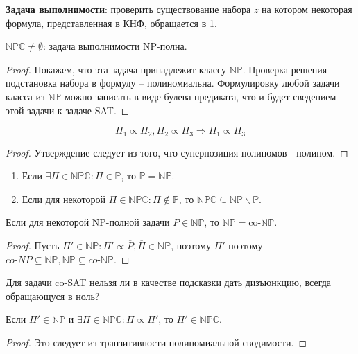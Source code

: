 \documentclass[11pt]{article}
\newcounter{th}\setcounter{th}{0}
\def\th{\par\smallskip\refstepcounter{th}\textbf{\arabic{th}}}
\newtheorem*{Theorem}{Теорема \th}
\newcounter{stnmt}\setcounter{stnmt}{0}
\def\st{\par\smallskip\refstepcounter{stnmt}\textbf{\arabic{stnmt}}}
\newtheorem*{Statement}{Утверждение \st}
\begin{document}
\textbf{Задача выполнимости}: проверить существование набора \(z\) на котором некоторая формула,
представленная в КНФ, обращается в 1.
\begin{Theorem}
$\mathbb{NPC} \neq \emptyset$: задача выполнимости NP-полна.
\end{Theorem}
\begin{proof}
Покажем, что эта задача принадлежит классу $\mathbb{NP}$. Проверка решения -- подстановка
набора в формулу -- полиномиальна. Формулировку любой задачи класса из $\mathbb{NP}$ можно
записать в виде булева предиката, что и будет сведением этой задачи к задаче SAT.
\end{proof}
\begin{Statement}
\begin{equation*}
\Pi_1 \propto \Pi_2, \Pi_2 \propto \Pi_3 \Rightarrow \Pi_1 \propto \Pi_3
\end{equation*}
\end{Statement}
\begin{proof}
Утверждение следует из того, что суперпозиция полиномов - полином.
\end{proof}
\begin{Statement}
\begin{enumerate}
\item Если $\exists \Pi \in \mathbb{NPC}: \Pi \in \mathbb{P}$, то $\mathbb{P} = \mathbb{NP}$.
\item Если для некоторой $\Pi \in \mathbb{NPC}: \Pi \notin \mathbb{P}$, то $\mathbb{NPC} \subseteq \mathbb{NP} \backslash \mathbb{P}$.
\end{enumerate}
\end{Statement}
\begin{Statement}
Если для некоторой NP-полной задачи $\overline{P} \in \mathbb{NP}$,
то $\mathbb{NP} = \text{co-}\mathbb{NP}$.
\end{Statement}
\begin{proof}
Пусть $\Pi' \in \mathbb{NP}: \overline{\Pi'} \propto \overline{P}, \overline{\Pi} \in \mathbb{NP}$,
поэтому $\overline{\Pi'}$ поэтому $\textit{co-}NP \subseteq \mathbb{NP}, \mathbb{NP} \subseteq \textit{co-}\mathbb{NP}$.
\end{proof}
Для задачи co-SAT нельзя ли в качестве подсказки дать дизъюнкцию, всегда обращающуся в ноль?
\begin{Statement}
Если $\Pi' \in \mathbb{NP}$ и $\exists \Pi \in \mathbb{NPC}: \Pi \propto \Pi'$, то
$\Pi' \in \mathbb{NPC}$.
\end{Statement}
\begin{proof}
Это следует из транзитивности полиномиальной сводимости.
\end{proof}
\end{document}

